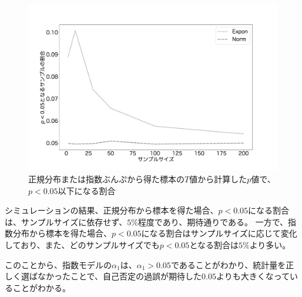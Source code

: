 \begin{figure}
    \begin{center}
        \includegraphics[width=15cm]{./image/04_/t_test_expon_norm.pdf}
        \caption{正規分布または指数ぶんぷから得た標本の$T$値から計算した$p$値で、$p<0.05$以下になる割合}
    \end{center}
\end{figure}

シミュレーションの結果、正規分布から標本を得た場合、$p<0.05$になる割合は、サンプルサイズに依存せず、$5\%$程度であり、期待通りである。
一方で、指数分布から標本を得た場合、$p<0.05$になる割合はサンプルサイズに応じて変化しており、また、どのサンプルサイズでも$p<0.05$となる割合は$5\%$より多い。

このことから、指数モデルの$\alpha_1$は、$\alpha_1>0.05$であることがわかり、統計量を正しく選ばなかったことで、自己否定の過誤が期待した$0.05$よりも大きくなっていることがわかる。

